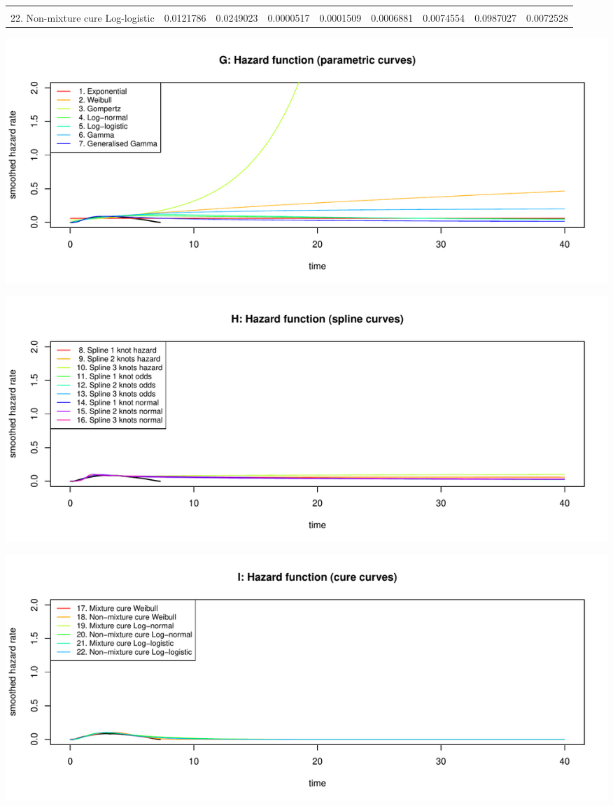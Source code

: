 \documentclass[
]{article}
\begin{document}
\begin{table}
{\begin{tabular}[t]{lrrrrrrrr}
\cellcolor{gray!6}{21. Mixture cure Log-logistic} & \cellcolor{gray!6}{0.0122019} & \cellcolor{gray!6}{0.0249146} & \cellcolor{gray!6}{0.0000516} & \cellcolor{gray!6}{0.0001512} & \cellcolor{gray!6}{0.0006917} & \cellcolor{gray!6}{0.0075147} & \cellcolor{gray!6}{0.0986522} & \cellcolor{gray!6}{0.0073113}\\
22. Non-mixture cure Log-logistic & 0.0121786 & 0.0249023 & 0.0000517 & 0.0001509 & 0.0006881 & 0.0074554 & 0.0987027 & 0.0072528\\
\bottomrule
\end{tabular}}
\end{table}

\begin{flushleft}\includegraphics[height=0.29\textheight]{Images/validate_extrapolation1-7} \end{flushleft}

\begin{flushleft}\includegraphics[height=0.29\textheight]{Images/validate_extrapolation1-8} \end{flushleft}

\begin{flushleft}\includegraphics[height=0.29\textheight]{Images/validate_extrapolation1-9} \end{flushleft}
\end{document}
